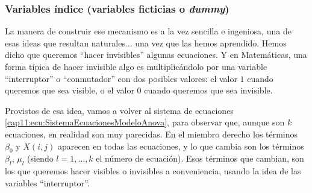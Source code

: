 \subsubsection{Variables índice (variables ficticias o {\em dummy})}
\label{cap11:subsubsec:VariablesDummy}

La manera de construir ese mecanismo es a la vez sencilla e ingeniosa, una de esas ideas que resultan naturales... una vez que las hemos aprendido. Hemos dicho que queremos ``hacer invisibles'' algunas ecuaciones. Y en Matemáticas, una forma típica de hacer invisible algo es multiplicándolo por una variable ``interruptor'' o ``conmutador'' con dos posibles valores: el valor $1$ cuando queremos que sea visible, o el valor $0$ cuando queremos que sea invisible.

Provistos de esa idea,  vamos a volver al sistema de ecuaciones \ref{cap11:ecu:SistemaEcuacionesModeloAnova}, para observar que, aunque son $k$ ecuaciones, en realidad son muy parecidas. En el miembro derecho los términos $\beta_0$ y $X(i,j)$ aparecen en todas las ecuaciones, y lo que cambia son los términos $\beta_l$, $\mu_l$ (siendo $l=1,\ldots,k$ el número de ecuación). Esos términos que cambian, son los que queremos hacer visibles o invisibles a conveniencia, usando la idea de las variables ``interruptor''.

